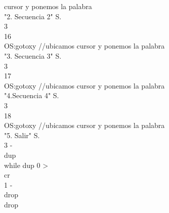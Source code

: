 \documentclass[conference]{IEEEtran}
\begin{document}
\begin{enumerate}
\begin{center}
cursor y ponemos la palabra \\ "2. Secuencia 2" S. \\ 3 \\ 16 \\ OS:gotoxy //ubicamos cursor y ponemos la palabra \\ "3. Secuencia 3" S. \\ 3 \\ 17 \\ OS:gotoxy //ubicamos cursor y ponemos la palabra \\ "4.Secuencia 4" S. \\ 3 \\ 18 \\ OS:gotoxy //ubicamos cursor y ponemos la palabra \\ "5. Salir" S. \\ 3 - \\ dup \\ while dup 0 > \\ cr \\ 1 - \\ drop \\ drop \\ 
	\end{center}
	

\end{enumerate}
\end{document}
